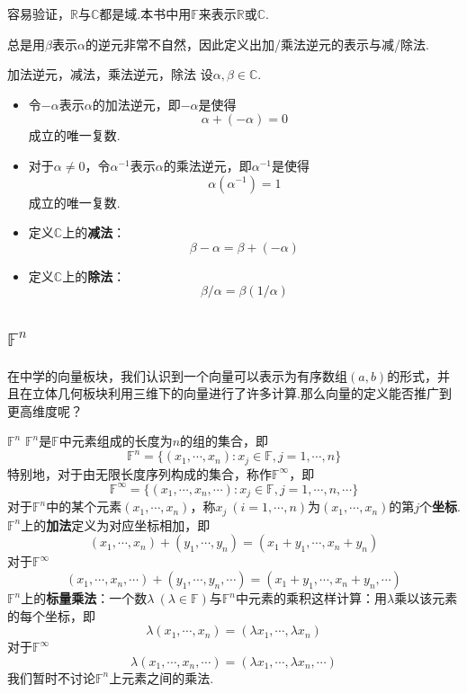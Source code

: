 \documentclass[lang=cn, zihao=5]{elegantbook}
\newcommand{\R}{\mathbb{R}}
\newcommand{\C}{\mathbb{C}}
\newcommand{\F}{\mathbb{F}}
\begin{document}
容易验证，$\R$与$\C$都是域.本书中用$\F$来表示$\R$或$\C$.

总是用$\beta$表示$\alpha$的逆元非常不自然，因此定义出加/乘法逆元的表示与减/除法.

\begin{definition}{加法逆元，减法，乘法逆元，除法}
	设$\alpha , \beta \in \C $.
	\begin{itemize}
		\item 令$- \alpha$表示$\alpha$的加法逆元，即$-\alpha$是使得$$\alpha + (-\alpha) = 0$$成立的唯一复数.
		\item 对于$\alpha \neq 0$，令$\alpha ^{-1}$表示$\alpha$的乘法逆元，即$\alpha ^{-1}$是使得$$\alpha (\alpha ^{-1}) = 1$$成立的唯一复数.
		\item 定义$\C $上的\textbf{减法}：$$\beta - \alpha = \beta + (-\alpha)$$
		\item 定义$\C $上的\textbf{除法}：$$\beta / \alpha = \beta (1 / \alpha)$$
	\end{itemize}
\end{definition}

\subsection{$\F ^{n}$}

在中学的向量板块，我们认识到一个向量可以表示为有序数组$(a,b)$的形式，并且在立体几何板块利用三维下的向量进行了许多计算.那么向量的定义能否推广到更高维度呢？

\begin{definition}{$\F ^{n}$}
	$\F ^{n}$是$\F$中元素组成的长度为$n$的组的集合，即$$\F ^{n} = \{ (x_1,\cdots ,x_n) : x_j \in \F , j=1, \cdots ,n \}$$
	特别地，对于由无限长度序列构成的集合，称作$\F ^{\infty}$，即
	$$\F ^{\infty} = \{ (x_1,\cdots ,x_n, \cdots) : x_j \in \F , j=1, \cdots ,n, \cdots \}$$
	对于$\F ^{n}$中的某个元素$(x_1,\cdots ,x_n)$，称$x_j ~(i=1,\cdots ,n)$为$(x_1,\cdots ,x_n)$的第$j$个\textbf{坐标}. \\
	$\F ^{n}$上的\textbf{加法}定义为对应坐标相加，即
	$$(x_1, \cdots , x_n) + (y_1 , \cdots , y_n) = (x_1+y_1, \cdots , x_n+y_n)$$
	对于$\F ^{\infty}$
	$$(x_1, \cdots , x_n, \cdots) + (y_1 , \cdots , y_n ,\cdots) = (x_1+y_1, \cdots , x_n+y_n ,\cdots)$$
	$\F ^{n}$上的\textbf{标量乘法}：一个数$\lambda ~(\lambda \in \F )$与$\F ^{n}$中元素的乘积这样计算：用$\lambda$乘以该元素的每个坐标，即
	$$\lambda (x_1,\cdots ,x_n) = (\lambda x_1, \cdots ,\lambda x_n)$$
	对于$\F ^{\infty}$
	$$\lambda (x_1,\cdots ,x_n, \cdots) = (\lambda x_1, \cdots ,\lambda x_n,\cdots)$$
	我们暂时不讨论$\F ^{n}$上元素之间的乘法.
\end{definition}
\end{document}
